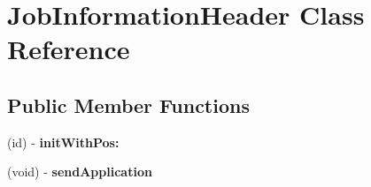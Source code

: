 \hypertarget{interface_job_information_header}{
\section{\-Job\-Information\-Header \-Class \-Reference}
\label{interface_job_information_header}
}
\subsection*{\-Public \-Member \-Functions}
\begin{DoxyCompactItemize}
\item 
\hypertarget{interface_job_information_header_af70cc1f9879fccc94c3f04acf08b32ef}{
(id) -\/ {\bfseries init\-With\-Pos\-:}}
\label{interface_job_information_header_af70cc1f9879fccc94c3f04acf08b32ef}

\item 
\hypertarget{interface_job_information_header_a98d5a1203fa386f93cabb24cae7e1457}{
(void) -\/ {\bfseries send\-Application}}
\label{interface_job_information_header_a98d5a1203fa386f93cabb24cae7e1457}

\end{DoxyCompactItemize}
